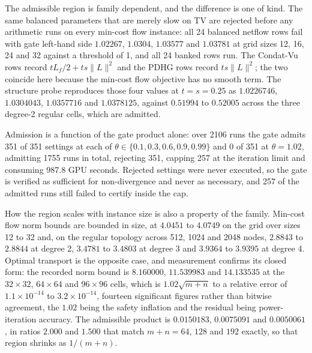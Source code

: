 The admissible region is family dependent, and the difference is one of kind.
The same balanced parameters that are merely slow on TV are rejected before any
arithmetic runs on every min-cost flow instance: all 24 balanced netflow rows
fail with gate left-hand side $1.02267$, $1.0304$, $1.03577$ and $1.03781$ at
grid sizes 12, 16, 24 and 32 against a threshold of 1, and all 24 banked rows
run. The Condat-Vu rows record $t L_f / 2 + t s \lVert L \rVert^2$ and the PDHG
rows record $t s \lVert L \rVert^2$; the two coincide here because the min-cost
flow objective has no smooth term. The structure probe reproduces those four
values at $t = s = 0.25$ as $1.0226746$, $1.0304043$, $1.0357716$ and
$1.0378125$, against $0.51994$ to $0.52005$ across the three degree-2 regular
cells, which are admitted.

Admission is a function of the gate product alone: over 2106 runs the gate
admits 351 of 351 settings at each of $\theta \in \{0.1, 0.3, 0.6, 0.9,
0.99\}$ and 0 of 351 at $\theta = 1.02$, admitting 1755 runs in total,
rejecting 351, capping 257 at the iteration limit and consuming 987.8 GPU
seconds. Rejected settings were never executed, so the gate is verified as
sufficient for non-divergence and never as necessary, and 257 of the admitted
runs still failed to certify inside the cap.

How the region scales with instance size is also a property of the family.
Min-cost flow norm bounds are bounded in size, at $4.0451$ to $4.0749$ on the
grid over sizes 12 to 32 and, on the regular topology across 512, 1024 and 2048
nodes, $2.8843$ to $2.8844$ at degree 2, $3.4781$ to $3.4803$ at degree 3 and
$3.9364$ to $3.9395$ at degree 4. Optimal transport is the opposite case, and
measurement confirms its closed form: the recorded norm bound is $8.160000$,
$11.539983$ and $14.133535$ at the $32\times32$, $64\times64$ and $96\times96$
cells, which is $1.02\sqrt{m+n}$ to a relative error of $1.1 \times 10^{-14}$
to $3.2 \times 10^{-14}$, fourteen significant figures rather than bitwise
agreement, the $1.02$ being the safety inflation and the residual being
power-iteration accuracy. The admissible product is $0.0150183$, $0.0075091$
and $0.0050061$, in ratios $2.000$ and $1.500$ that match $m+n = 64$, $128$ and
$192$ exactly, so that region shrinks as $1/(m{+}n)$.

